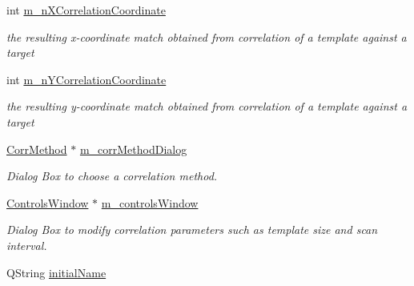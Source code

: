 \begin{CompactItemize}
\item 
\hypertarget{classQcorr_53798525ce189307cf597e71aabca91b}{
int \hyperlink{classQcorr_53798525ce189307cf597e71aabca91b}{m\_\-nXCorrelationCoordinate}}
\label{classQcorr_53798525ce189307cf597e71aabca91b}

\begin{CompactList}\small\item\em the resulting x-coordinate match obtained from correlation of a template against a target \item\end{CompactList}\item 
\hypertarget{classQcorr_29f34cc7b765d5a64856696c48bfc191}{
int \hyperlink{classQcorr_29f34cc7b765d5a64856696c48bfc191}{m\_\-nYCorrelationCoordinate}}
\label{classQcorr_29f34cc7b765d5a64856696c48bfc191}

\begin{CompactList}\small\item\em the resulting y-coordinate match obtained from correlation of a template against a target \item\end{CompactList}\item 
\hypertarget{classQcorr_6509fcbf4cd8925aa109cc53e638b69a}{
\hyperlink{classCorrMethod}{CorrMethod} $\ast$ \hyperlink{classQcorr_6509fcbf4cd8925aa109cc53e638b69a}{m\_\-corrMethodDialog}}
\label{classQcorr_6509fcbf4cd8925aa109cc53e638b69a}

\begin{CompactList}\small\item\em Dialog Box to choose a correlation method. \item\end{CompactList}\item 
\hypertarget{classQcorr_5b43654ac42b41b945cd58ce62b18ed0}{
\hyperlink{classControlsWindow}{ControlsWindow} $\ast$ \hyperlink{classQcorr_5b43654ac42b41b945cd58ce62b18ed0}{m\_\-controlsWindow}}
\label{classQcorr_5b43654ac42b41b945cd58ce62b18ed0}

\begin{CompactList}\small\item\em Dialog Box to modify correlation parameters such as template size and scan interval. \item\end{CompactList}\item 
\hypertarget{classQcorr_3430716ddbe203f677095c163da87f86}{
QString \hyperlink{classQcorr_3430716ddbe203f677095c163da87f86}{initialName}}
\label{classQcorr_3430716ddbe203f677095c163da87f86}


\end{CompactItemize}
